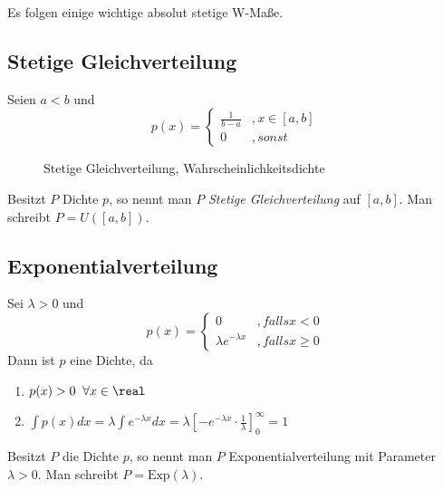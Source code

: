 Es folgen einige wichtige absolut stetige W-Maße.

\subsection{Stetige Gleichverteilung}
Seien $a < b$ und
\begin{equation*}
    p(x) = \begin{cases}
        \frac{1}{b-a} & , x \in [a,b] \\
        0             & , sonst
    \end{cases}
\end{equation*}

\begin{figure}[H]
    \centering
    \caption{Stetige Gleichverteilung, Wahrscheinlichkeitsdichte}
    \label{}
\end{figure}

Besitzt $P$ Dichte $p$, so nennt man $P$ \emph{Stetige Gleichverteilung} auf $[a,b]$.
Man schreibt $P=U([a,b])$.

\subsection{Exponentialverteilung}
Sei $\lambda > 0$ und
\begin{equation*}
    p(x) = \begin{cases}
        0                      & , falls x < 0    \\
        \lambda e^{-\lambda x} & , falls x \geq 0
    \end{cases}
\end{equation*}
Dann ist $p$ eine Dichte, da
\begin{enumerate}
    \item $p(x) > 0 \;\; \forall x \in \real$
    \item $\int p(x) dx = \lambda \int e^{-\lambda x} dx = \lambda\left[-e^{-\lambda x} \cdot \frac{1}{\lambda}\right]_0^\infty = 1$
\end{enumerate}
Besitzt $P$ die Dichte $p$, so nennt man $P$ Exponentialverteilung mit Parameter $\lambda>0$.
Man schreibt $P=\text{Exp}(\lambda)$.

